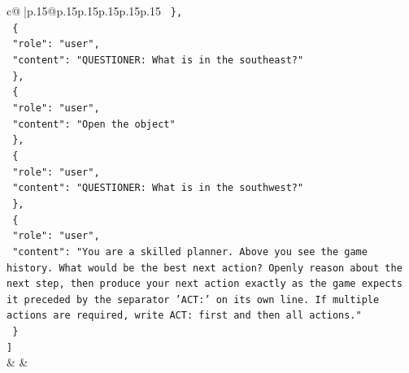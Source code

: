 \documentclass{article}
\begin{document}
{\begin{supertabular}{c@{$\;$}|p{.15\linewidth}@{}p{.15\linewidth}p{.15\linewidth}p{.15\linewidth}p{.15\linewidth}p{.15\linewidth}}
{{{\texttt{  \},} \\
\texttt{  \{} \\
\texttt{    "role": "user",} \\
\texttt{    "content": "QUESTIONER: What is in the southeast?"} \\
\texttt{  \},} \\
\texttt{  \{} \\
\texttt{    "role": "user",} \\
\texttt{    "content": "Open the object"} \\
\texttt{  \},} \\
\texttt{  \{} \\
\texttt{    "role": "user",} \\
\texttt{    "content": "QUESTIONER: What is in the southwest?"} \\
\texttt{  \},} \\
\texttt{  \{} \\
\texttt{    "role": "user",} \\
\texttt{    "content": "You are a skilled planner. Above you see the game history. What would be the best next action? Openly reason about the next step, then produce your next action exactly as the game expects it preceded by the separator 'ACT:' on its own line. If multiple actions are required, write ACT: first and then all actions."} \\
\texttt{  \}} \\
\texttt{{]}} \\
            }
        }
    }
    & & \\ \\


\end{supertabular}}
\end{document}
